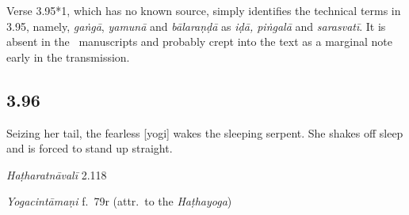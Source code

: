 \begin{ekdosis}
\begin{philcomm}[hp03_095_1]
Verse 3.95*1, which has no known source, simply identifies the technical terms in 3.95, namely, \emph{gaṅgā}, \emph{yamunā} and \emph{bālaraṇḍā} as \emph{iḍā, piṅgalā} and \emph{sarasvatī}. It is absent in the \textalpha\ manuscripts and probably crept into the text as a marginal note early in the transmission.     
\end{philcomm}

\subsection*{3.96}
\begin{translation}[hp03_096]
Seizing her tail, the fearless [yogi] wakes the sleeping serpent.  She shakes off sleep and is forced to stand up straight.
\end{translation}


\begin{testimonia}[hp03_096]
\emph{Haṭharatnāvalī} 2.118
\begin{versinnote}
\end{versinnote}

\emph{Yogacintāmaṇi} f.~79r (attr.~to the \emph{Haṭhayoga})
\begin{versinnote}
\end{versinnote}

\end{testimonia}



\end{ekdosis}
